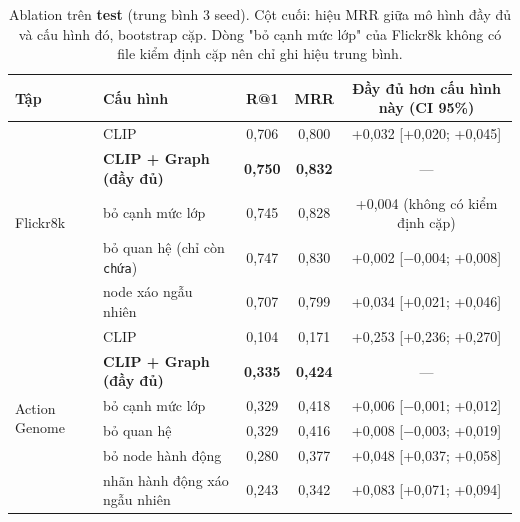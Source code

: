\documentclass[11pt,a4paper]{article}
\newcommand{\negv}[1]{\textcolor{bad}{#1}}
\begin{document}
\begin{table}[H]
\centering\small
\begin{tabular}{llccc}
\toprule
\textbf{Tập} & \textbf{Cấu hình} & \textbf{R@1} & \textbf{MRR} & \textbf{Đầy đủ hơn cấu hình này (CI 95\%)} \\
\midrule
\multirow{5}{*}{Flickr8k}
 & CLIP & 0,706 & 0,800 & +0,032 [+0,020; +0,045] \\
 & \textbf{CLIP + Graph (đầy đủ)} & \textbf{0,750} & \textbf{0,832} & — \\
 & bỏ cạnh mức lớp & 0,745 & 0,828 & +0,004 (không có kiểm định cặp) \\
 & bỏ quan hệ (chỉ còn \texttt{chứa}) & 0,747 & 0,830 & +0,002 [−0,004; +0,008] \\
 & \negv{node xáo ngẫu nhiên} & 0,707 & \negv{0,799} & +0,034 [+0,021; +0,046] \\
\midrule
\multirow{6}{*}{Action Genome}
 & CLIP & 0,104 & 0,171 & +0,253 [+0,236; +0,270] \\
 & \textbf{CLIP + Graph (đầy đủ)} & \textbf{0,335} & \textbf{0,424} & — \\
 & bỏ cạnh mức lớp & 0,329 & 0,418 & +0,006 [−0,001; +0,012] \\
 & bỏ quan hệ & 0,329 & 0,416 & +0,008 [−0,003; +0,019] \\
 & bỏ node hành động & 0,280 & 0,377 & +0,048 [+0,037; +0,058] \\
 & \negv{nhãn hành động xáo ngẫu nhiên} & 0,243 & \negv{0,342} & +0,083 [+0,071; +0,094] \\
\bottomrule
\end{tabular}
\caption{Ablation trên \textbf{test} (trung bình 3 seed). Cột cuối: hiệu MRR giữa mô hình đầy đủ và cấu hình đó, bootstrap cặp. Dòng "bỏ cạnh mức lớp" của Flickr8k không có file kiểm định cặp nên chỉ ghi hiệu trung bình.}
\label{tab:ablation}
\end{table}
\end{document}
